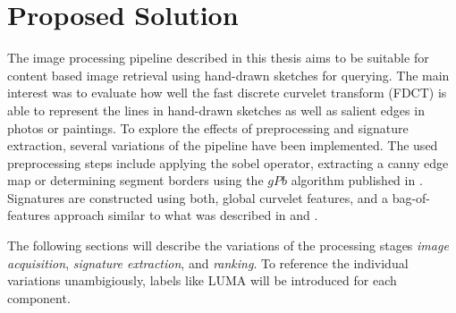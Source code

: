 \chapter{Proposed Solution}\label{ch:solution}

The image processing pipeline described in this thesis aims to be suitable for
content based image retrieval using hand-drawn sketches for querying. The main
interest was to evaluate how well the fast discrete curvelet transform (FDCT)
\autocite{candes_fast_2006} is able to represent the lines in hand-drawn
sketches as well as salient edges in photos or paintings. To explore the
effects of preprocessing and signature extraction, several variations of the
pipeline have been implemented. The used preprocessing steps include applying
the sobel operator, extracting a canny edge map or determining segment borders
using the $gPb$ algorithm published in \autocite{arbelaez_contour_2011}.
Signatures are constructed using both, global curvelet features, and a
bag-of-features approach similar to what was described in
\autocite{sivic_video_2003} and \autocite{eitz_sketch-based_2010}.

The following sections will describe the variations of the processing stages
\emph{image acquisition}, \emph{signature extraction}, and \emph{ranking}. To
reference the individual variations unambigiously, labels like LUMA will
be introduced for each component.








